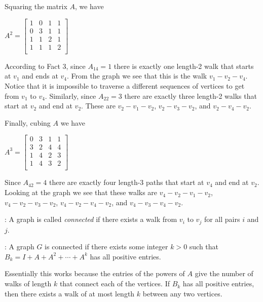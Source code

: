 \documentclass[12pt]{article}
\newcommand{\nin}{\noindent}
\newcommand{\vthree}{\vspace{3mm}}
\newcommand{\mymat}[1]{
\left[
\begin{array}{rrrrrrrrrrrrrrrrrrrrrrrrrrrrrrrrrrrrrrr}
#1
\end{array}
\right]
}
\begin{document}
\vthree

\nin Squaring the matrix $A$, we have

\vthree

\nin $
A^2 =
\mymat{
1 & 0 & 1 & 1 \\
0 & 3 & 1 & 1 \\
1 & 1 & 2 & 1 \\
1 & 1 & 1 & 2 \\
}
$

\vthree

\nin According to Fact 3, since $A_{14}=1$ there is exactly one length-2 walk that starts at $v_1$ and ends at $v_4$.  From the graph we see that this is the walk $v_1-v_2-v_4$.  Notice that it is impossible to traverse a different sequences of vertices to get from $v_1$ to $v_4$.  Similarly, since $A_{22} = 3$ there are exactly three length-2 walks that start at $v_2$ and end at $v_2$.  These are $v_2-v_1-v_2$, $v_2-v_3-v_2$, and $v_2-v_4-v_2$.

\clearpage

\nin Finally, cubing $A$ we have

\vthree

\nin $
A^3 =
\mymat{
0 & 3 & 1 & 1 \\
3 & 2 & 4 & 4 \\
1 & 4 & 2 & 3 \\
1 & 4 & 3 & 2 \\
}
$

\vthree

\nin Since $A_{42} = 4$ there are exactly four length-3 paths that start at $v_4$ and end at $v_2$.  Looking at the graph we see that these walks are $v_4-v_2-v_1-v_2$, $v_4-v_2-v_3-v_2$, $v_4-v_2-v_4-v_2$, and $v_4-v_3-v_4-v_2$.

\vthree

\nin {\bf Def}: A graph is called {\it connected} if there exists a walk from $v_i$ to $v_j$ for all pairs $i$ and $j$.

\vthree

\nin {\bf Fact 4}: A graph $G$ is connected if there exists some integer $k > 0$ such that $B_k = I + A + A^2 + \cdots + A^k$ has all positive entries.

\vthree

\nin Essentially this works because the entries of the powers of $A$ give the number of walks of length $k$ that connect each of the vertices.  If $B_k$ has all positive entries, then there exists a walk of at most length $k$ between any two vertices.

\vthree
\end{document}
